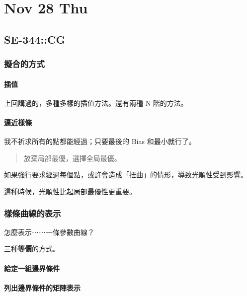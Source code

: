 \documentclass[
]{article}
\date{}
\begin{document}
\hypertarget{header-n0}{%
\section{Nov 28 Thu}\label{header-n0}}

\hypertarget{header-n2}{%
\subsection{SE-344::CG}\label{header-n2}}

\hypertarget{header-n3}{%
\subsubsection{擬合的方式}\label{header-n3}}

\hypertarget{header-n4}{%
\paragraph{插值}\label{header-n4}}

上回講過的，多種多樣的插值方法。還有兩種 N 階的方法。

\hypertarget{header-n6}{%
\paragraph{逼近樣條}\label{header-n6}}

我不祈求所有的點都能經過；只要最後的 Bias 和最小就行了。

\begin{quote}
放棄局部最優，選擇全局最優。
\end{quote}

如果強行要求經過每個點，或許會造成「扭曲」的情形，導致光順性受到影響。

這種時候，光順性比起局部最優性更重要。

\hypertarget{header-n12}{%
\subsubsection{樣條曲線的表示}\label{header-n12}}

怎麼表示⋯⋯一條參數曲線？

三種\textbf{等價}的方式。

\hypertarget{header-n15}{%
\paragraph{給定一組邊界條件}\label{header-n15}}

\hypertarget{header-n16}{%
\paragraph{列出邊界條件的矩陣表示}\label{header-n16}}
\end{document}
